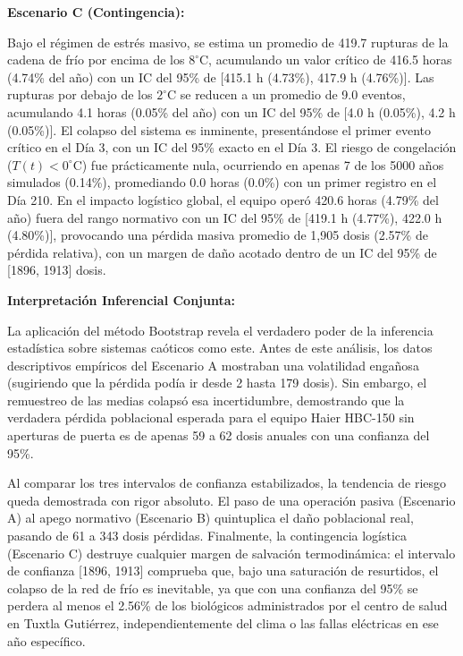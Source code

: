 \documentclass[
  spanish,
  letterpaper,
  DIV=11,
  numbers=noendperiod]{scrreprt}
\theoremstyle{plain}
\theoremstyle{plain}
\theoremstyle{plain}
\theoremstyle{definition}
\theoremstyle{remark}
\begin{document}
\textbf{Escenario C (Contingencia):}

Bajo el régimen de estrés masivo, se estima un promedio de 419.7
rupturas de la cadena de frío por encima de los \(8^\circ\text{C}\),
acumulando un valor crítico de 416.5 horas (4.74\% del año) con un IC
del 95\% de {[}415.1 h (4.73\%), 417.9 h (4.76\%){]}. Las rupturas por
debajo de los \(2^\circ\text{C}\) se reducen a un promedio de 9.0
eventos, acumulando 4.1 horas (0.05\% del año) con un IC del 95\% de
{[}4.0 h (0.05\%), 4.2 h (0.05\%){]}. El colapso del sistema es
inminente, presentándose el primer evento crítico en el Día 3, con un IC
del 95\% exacto en el Día 3. El riesgo de congelación
(\(T(t)<0^\circ\text{C}\)) fue prácticamente nula, ocurriendo en apenas
7 de los 5000 años simulados (0.14\%), promediando 0.0 horas (0.0\%) con
un primer registro en el Día 210. En el impacto logístico global, el
equipo operó 420.6 horas (4.79\% del año) fuera del rango normativo con
un IC del 95\% de {[}419.1 h (4.77\%), 422.0 h (4.80\%){]}, provocando
una pérdida masiva promedio de 1,905 dosis (2.57\% de pérdida relativa),
con un margen de daño acotado dentro de un IC del 95\% de {[}1896,
1913{]} dosis.

\textbf{Interpretación Inferencial Conjunta:}

La aplicación del método Bootstrap revela el verdadero poder de la
inferencia estadística sobre sistemas caóticos como este. Antes de este
análisis, los datos descriptivos empíricos del Escenario A mostraban una
volatilidad engañosa (sugiriendo que la pérdida podía ir desde 2 hasta
179 dosis). Sin embargo, el remuestreo de las medias colapsó esa
incertidumbre, demostrando que la verdadera pérdida poblacional esperada
para el equipo Haier HBC-150 sin aperturas de puerta es de apenas 59 a
62 dosis anuales con una confianza del 95\%.

Al comparar los tres intervalos de confianza estabilizados, la tendencia
de riesgo queda demostrada con rigor absoluto. El paso de una operación
pasiva (Escenario A) al apego normativo (Escenario B) quintuplica el
daño poblacional real, pasando de 61 a 343 dosis pérdidas. Finalmente,
la contingencia logística (Escenario C) destruye cualquier margen de
salvación termodinámica: el intervalo de confianza {[}1896, 1913{]}
comprueba que, bajo una saturación de resurtidos, el colapso de la red
de frío es inevitable, ya que con una confianza del 95\% se perdera al
menos el 2.56\% de los biológicos administrados por el centro de salud
en Tuxtla Gutiérrez, independientemente del clima o las fallas
eléctricas en ese año específico.
\end{document}
